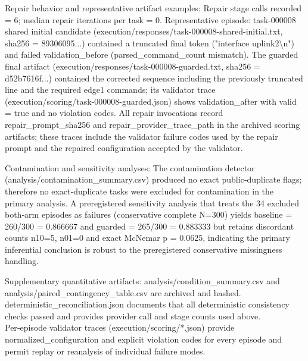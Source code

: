 \documentclass[conference]{IEEEtran}
\begin{document}
Repair behavior and representative artifact examples: Repair stage calls recorded = 6; median repair iterations per task = 0. Representative episode: task-000008 shared initial candidate (execution/responses/task-000008-shared-initial.txt, sha256 = 89306095...) contained a truncated final token ("interface uplink2\textbackslash{}n") and failed validation\_before (parsed\_command\_count mismatch). The guarded final artifact (execution/responses/task-000008-guarded.txt, sha256 = d52b7616f...) contained the corrected sequence including the previously truncated line and the required edge1 commands; its validator trace (execution/scoring/task-000008-guarded.json) shows validation\_after with valid = true and no violation codes. All repair invocations record repair\_prompt\_sha256 and repair\_provider\_trace\_path in the archived scoring artifacts; these traces include the validator failure codes used by the repair prompt and the repaired configuration accepted by the validator.

Contamination and sensitivity analyses: The contamination detector (analysis/contamination\_summary.csv) produced no exact public‑duplicate flags; therefore no exact‑duplicate tasks were excluded for contamination in the primary analysis. A preregistered sensitivity analysis that treats the 34 excluded both‑arm episodes as failures (conservative complete N=300) yields baseline = 260/300 = 0.866667 and guarded = 265/300 = 0.883333 but retains discordant counts n10=5, n01=0 and exact McNemar p = 0.0625, indicating the primary inferential conclusion is robust to the preregistered conservative missingness handling.

Supplementary quantitative artifacts: analysis/condition\_summary.csv and analysis/paired\_contingency\_table.csv are archived and hashed. deterministic\_reconciliation.json documents that all deterministic consistency checks passed and provides provider call and stage counts used above. Per‑episode validator traces (execution/scoring/*.json) provide normalized\_configuration and explicit violation codes for every episode and permit replay or reanalysis of individual failure modes.
\end{document}
